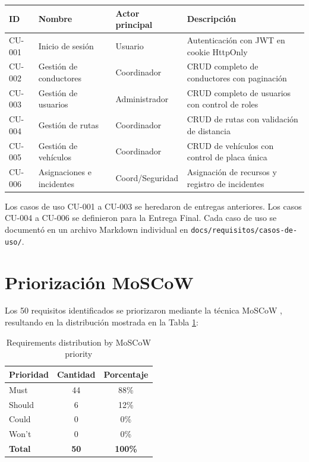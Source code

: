 \begin{longtable}{@{}p{1.5cm}p{3cm}p{3cm}p{6cm}@{}}
\toprule
\textbf{ID} & \textbf{Nombre} & \textbf{Actor principal} & \textbf{Descripción} \\
\midrule
\endhead
CU-001 & Inicio de sesión & Usuario & Autenticación con JWT en cookie HttpOnly \\
CU-002 & Gestión de conductores & Coordinador & CRUD completo de conductores con paginación \\
CU-003 & Gestión de usuarios & Administrador & CRUD completo de usuarios con control de roles \\
CU-004 & Gestión de rutas & Coordinador & CRUD de rutas con validación de distancia \\
CU-005 & Gestión de vehículos & Coordinador & CRUD de vehículos con control de placa única \\
CU-006 & Asignaciones e incidentes & Coord/Seguridad & Asignación de recursos y registro de incidentes \\
\bottomrule
\end{longtable}

Los casos de uso CU-001 a CU-003 se heredaron de entregas anteriores. Los casos CU-004 a CU-006 se definieron para la Entrega Final. Cada caso de uso se documentó en un archivo Markdown individual en \texttt{docs/requisitos/casos-de-uso/}.

\section{Priorización MoSCoW}
\label{sec:moscow-application}

Los 50 requisitos identificados se priorizaron mediante la técnica MoSCoW \cite{wiegers2013}, resultando en la distribución mostrada en la Tabla \ref{tab:moscow}:

\begin{table}[H]
\centering
\caption{Requirements distribution by MoSCoW priority}
\label{tab:moscow}
\begin{tabular}{lcc}
\toprule
\textbf{Prioridad} & \textbf{Cantidad} & \textbf{Porcentaje} \\
\midrule
Must & 44 & 88\% \\
Should & 6 & 12\% \\
Could & 0 & 0\% \\
Won't & 0 & 0\% \\
\midrule
\textbf{Total} & \textbf{50} & \textbf{100\%} \\
\bottomrule
\end{tabular}
\end{table}

